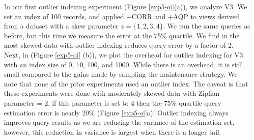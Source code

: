 In our first outlier indexing experiment (Figure \ref{exp5-oi}(a)), we analyze V3.
We set an index of 100 records, and applied \svcnospace+CORR and \svcnospace+AQP to views derived from a dataset with a skew parameter $z=\{1,2,3,4\}$. 
We run the same queries as before, but this time we measure the error at the 75\% quartile.
We find in the most skewed data \svc with outlier indexing reduces query error by a factor of 2.
Next, in \big(Figure \ref{exp5-oi} (b)\big), we plot the overhead for outlier indexing for V3 with an index size of 0, 10, 100, and 1000.
While there is an overhead, it is still small compared to the gains made by sampling the maintenance strategy.
We note that none of the prior experiments used an outlier index. 
The caveat is that these experiments were done with moderately skewed data with Zipfian parameter = 2, if this parameter is set to 4 then the 75\% quartile query estimation error is nearly 20\% (Figure \ref{exp5-oi}a).
Outlier indexing always improves query results as we are reducing the variance of the estimation set, however, this reduction in variance is largest when there is a longer tail.

